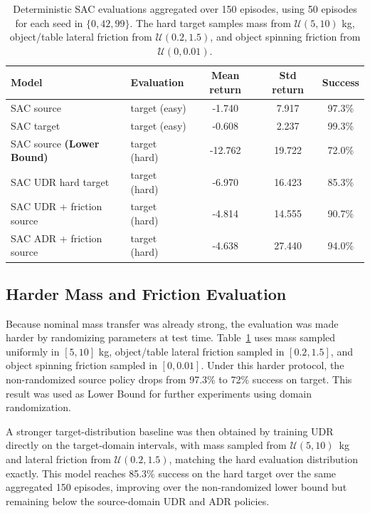 \begin{table}[t]
\centering
\small
\begin{tabular}{llccc}
\toprule
Model & Evaluation & Mean return & Std return & Success \\
\midrule
SAC source  & target (easy) & -1.740 & 7.917 & 97.3\%\\
SAC target  & target (easy) & -0.608 & 2.237 & 99.3\% \\
\midrule
SAC source \textbf{(Lower Bound)} & target (hard) & -12.762 & 19.722 & 72.0\% \\
SAC UDR hard target & target (hard) & -6.970 & 16.423 & 85.3\% \\
SAC UDR + friction source & target (hard) & -4.814 & 14.555 & 90.7\% \\
SAC ADR + friction source & target (hard) & -4.638 & 27.440 & 94.0\% \\
\bottomrule
\end{tabular}
\caption{Deterministic SAC evaluations aggregated over 150 episodes, using 50 episodes for each seed in $\{0,42,99\}$. The hard target samples mass from $\mathcal{U}(5,10)$ kg, object/table lateral friction from $\mathcal{U}(0.2,1.5)$, and object spinning friction from $\mathcal{U}(0,0.01)$.}
\label{tab:nominal-eval}
\end{table}

\subsection{Harder Mass and Friction Evaluation}
Because nominal mass transfer was already strong, the evaluation was made harder by randomizing parameters at test time.
Table~\ref{tab:nominal-eval} uses mass sampled uniformly in $[5,10]$ kg, object/table lateral friction sampled in $[0.2,1.5]$, and object spinning friction sampled in $[0,0.01]$.
Under this harder protocol, the non-randomized source policy drops from 97.3\% to 72\% success on target. 
This result was used as Lower Bound for further experiments using domain randomization. 

A stronger target-distribution baseline was then obtained by training UDR directly on the target-domain intervals, with mass sampled from $\mathcal{U}(5,10)$~kg and lateral friction from $\mathcal{U}(0.2,1.5)$, matching the hard evaluation distribution exactly.
This model reaches 85.3\% success on the hard target over the same aggregated 150 episodes, improving over the non-randomized lower bound but remaining below the source-domain UDR and ADR policies.

